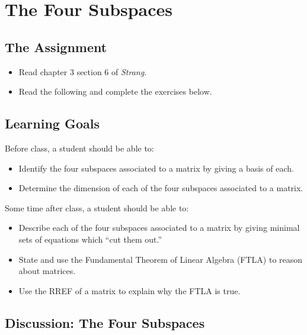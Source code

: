 \documentclass[10pt,]{book}
\theoremstyle{plain}
\theoremstyle{definition}
\numberwithin{equation}{section}
\begin{document}
\section[The Four Subspaces]{The Four Subspaces}\label{four-subspaces}
\typeout{************************************************}
\typeout{************************************************}
\subsection[The Assignment]{The Assignment}\label{subsection-85}
\begin{itemize}
\item{}Read chapter 3 section 6 of \emph{Strang}.\item{}Read the following and complete the exercises below.\end{itemize}
\typeout{************************************************}
\typeout{************************************************}
\subsection[Learning Goals]{Learning Goals}\label{subsection-86}
Before class, a student should be able to:%
\begin{itemize}
\item{}Identify the four subspaces associated to a matrix by giving a basis
        of each.
      \item{}Determine the dimension of each of the four subspaces associated to a
        matrix.
      \end{itemize}
\par
Some time after class, a student should be able to:%
\begin{itemize}
\item{}Describe each of the four subspaces associated to a matrix by
        giving minimal sets of equations which ``cut them out.''
      \item{}State and use the Fundamental Theorem of Linear Algebra (FTLA)
        to reason about matrices.
      \item{}Use the RREF of a matrix to explain why the FTLA is true.\end{itemize}
\typeout{************************************************}
\typeout{************************************************}
\subsection[Discussion: The Four Subspaces]{Discussion: The Four Subspaces}\label{subsection-87}
\end{document}
